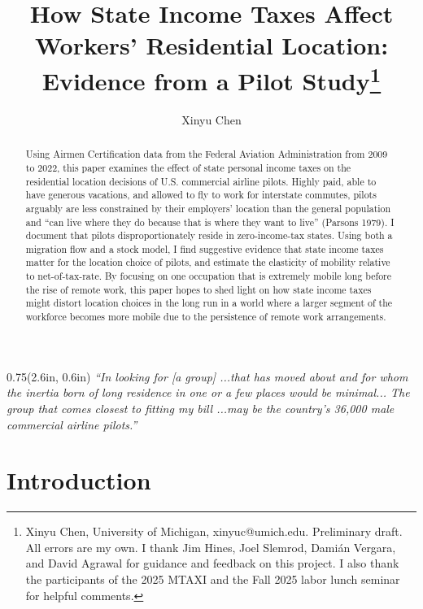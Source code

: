 \documentclass[11pt]{article}
\title{How State Income Taxes Affect Workers’ Residential Location: Evidence from a Pilot Study\footnote{Xinyu Chen, University of Michigan, xinyuc@umich.edu. Preliminary draft. All errors are my own. I thank Jim Hines, Joel Slemrod, Damián Vergara, and David Agrawal for guidance and feedback on this project. I also thank the participants of the 2025 MTAXI and the Fall 2025 labor lunch seminar for helpful comments.}}
\author{Xinyu Chen}
\begin{document}
	\maketitle
	
	
\begin{abstract}
	Using Airmen Certification data from the Federal Aviation Administration from 2009 to 2022, this paper examines the effect of state personal income taxes on the residential location decisions of U.S. commercial airline pilots. Highly paid, able to have generous vacations, and allowed to fly to work for interstate commutes, pilots arguably are less constrained by their employers’ location than the general population and “can live where they do because that is where they want to live” (Parsons 1979). I document that pilots disproportionately reside in zero-income-tax states. Using both a migration flow and a stock model, I find suggestive evidence that state income taxes matter for the location choice of pilots, and estimate the elasticity of mobility relative to net-of-tax-rate. By focusing on one occupation that is extremely mobile long before the rise of remote work, this paper hopes to shed light on how state income taxes might distort location choices in the long run in a world where a larger segment of the workforce becomes more mobile due to the persistence of remote work arrangements.
\end{abstract}

\newpage
\begin{textblock*}{0.75\textwidth}(2.6in, 0.6in)
	\small
	\justifying
	\emph{``In looking for [a group] ...that has moved about and for whom the inertia born of long residence in one or a few places would be minimal... The group that comes closest to fitting my bill ...may be the country's 36,000 male commercial airline pilots.''}\\
\end{textblock*}

\vspace*{0.2in}   %

\section{Introduction}
\end{document}
